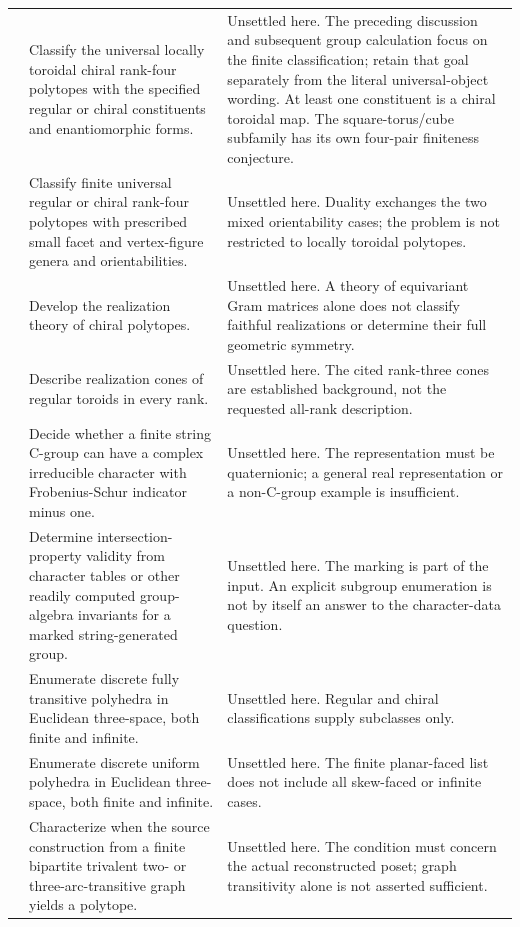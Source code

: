 \begin{longtable}{@{}>{\raggedright\arraybackslash}p{}>{\raggedright\arraybackslash}p{}>{\raggedright\arraybackslash}p{}@{}}
19 & Classify the universal locally toroidal chiral rank-four polytopes with the specified regular or chiral constituents and enantiomorphic forms. & Unsettled here. The preceding discussion and subsequent group calculation focus on the finite classification; retain that goal separately from the literal universal-object wording. At least one constituent is a chiral toroidal map. The square-torus/cube subfamily has its own four-pair finiteness conjecture.\\[5pt]
20 & Classify finite universal regular or chiral rank-four polytopes with prescribed small facet and vertex-figure genera and orientabilities. & Unsettled here. Duality exchanges the two mixed orientability cases; the problem is not restricted to locally toroidal polytopes.\\[5pt]
21 & Develop the realization theory of chiral polytopes. & Unsettled here. A theory of equivariant Gram matrices alone does not classify faithful realizations or determine their full geometric symmetry.\\[5pt]
22 & Describe realization cones of regular toroids in every rank. & Unsettled here. The cited rank-three cones are established background, not the requested all-rank description.\\[5pt]
23 & Decide whether a finite string C-group can have a complex irreducible character with Frobenius-Schur indicator minus one. & Unsettled here. The representation must be quaternionic; a general real representation or a non-C-group example is insufficient.\\[5pt]
24 & Determine intersection-property validity from character tables or other readily computed group-algebra invariants for a marked string-generated group. & Unsettled here. The marking is part of the input. An explicit subgroup enumeration is not by itself an answer to the character-data question.\\[5pt]
25 & Enumerate discrete fully transitive polyhedra in Euclidean three-space, both finite and infinite. & Unsettled here. Regular and chiral classifications supply subclasses only.\\[5pt]
26 & Enumerate discrete uniform polyhedra in Euclidean three-space, both finite and infinite. & Unsettled here. The finite planar-faced list does not include all skew-faced or infinite cases.\\[5pt]
27 & Characterize when the source construction from a finite bipartite trivalent two- or three-arc-transitive graph yields a polytope. & Unsettled here. The condition must concern the actual reconstructed poset; graph transitivity alone is not asserted sufficient.\\[5pt]

\end{longtable}
